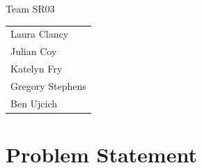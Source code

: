 \documentclass[11pt]{report}
\begin{document}
\begin{spacing}{1.5}

\thispagestyle{empty}

\vspace*{72pt}
{
\huge
\begin{center}
    \reporttitle
\end{center}
}
\vspace{72pt}

{
\huge
\begin{center}
  Team SR03
\end{center}
}

{
\Large 
\begin{center}
  \begin{tabular}{l}
    Laura Clancy \\
    Julian Coy \\
    Katelyn Fry \\
    Gregory Stephens \\
    Ben Ujcich
  \end{tabular}
\end{center}
}

\clearpage
\setcounter{page}{1}





\section*{Problem Statement} %


\end{spacing}
\end{document}
